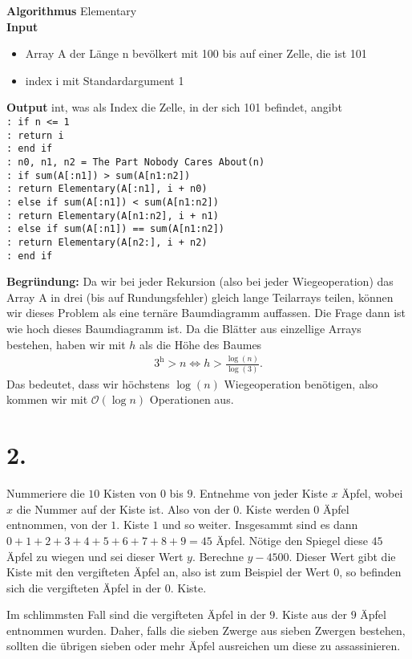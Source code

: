 \documentclass[a4paper]{book}
\theoremstyle{definition}
\begin{document}
\vspace{1cm}

\noindent\textbf{Algorithmus} Elementary \\
\textbf{Input}
\begin{itemize}
    \item Array A der Länge n bevölkert mit 100 bis auf einer Zelle, die ist 101
    \item index i mit Standardargument 1
\end{itemize}
\textbf{Output} int, was als Index die Zelle, in der sich 101 befindet, angibt \\
\texttt{: if n <= 1 \\
: \indent return i \\
: end if \\
: n0, n1, n2 = The Part Nobody Cares About(n) \\
: if sum(A[:n1]) > sum(A[n1:n2]) \\
: \indent return Elementary(A[:n1], i + n0) \\
: else if sum(A[:n1]) < sum(A[n1:n2]) \\
: \indent return Elementary(A[n1:n2], i + n1) \\
: else if sum(A[:n1]) == sum(A[n1:n2]) \\
: \indent return Elementary(A[n2:], i + n2) \\
: end if}

\vspace{1cm}

\noindent\textbf{Begründung:} Da wir bei jeder Rekursion (also bei jeder Wiegeoperation) das Array A in drei (bis auf Rundungsfehler) gleich lange Teilarrays teilen, können wir dieses Problem als eine ternäre Baumdiagramm auffassen. Die Frage dann ist wie hoch dieses Baumdiagramm ist. Da die Blätter aus einzellige Arrays bestehen, haben wir mit \(h\) als die Höhe des Baumes
\begin{align*}
    3^\text{h} > n \iff h > \frac{\log(n)}{\log(3)} \text{.}
\end{align*}
Das bedeutet, dass wir höchstens \(\log(n)\) Wiegeoperation benötigen, also kommen wir mit \(\mathcal{O}(\log n)\) Operationen aus.

\section*{2.}

Nummeriere die \(10\) Kisten von \(0\) bis \(9\). Entnehme von jeder Kiste \(x\) Äpfel, wobei \(x\) die Nummer auf der Kiste ist. Also von der \(0.\) Kiste werden \(0\) Äpfel entnommen, von der \(1.\) Kiste \(1\) und so weiter. Insgesammt sind es dann \(0 + 1 + 2 + 3 + 4 + 5 + 6 + 7 + 8 + 9 = 45\) Äpfel. Nötige den Spiegel diese \(45\) Äpfel zu wiegen und sei dieser Wert \(y\). Berechne \(y - 4500\). Dieser Wert gibt die Kiste mit den vergifteten Äpfel an, also ist zum Beispiel der Wert \(0\), so befinden sich die vergifteten Äpfel in der \(0.\) Kiste.

Im schlimmsten Fall sind die vergifteten Äpfel in der \(9.\) Kiste aus der \(9\) Äpfel entnommen wurden. Daher, falls die sieben Zwerge aus sieben Zwergen bestehen, sollten die übrigen sieben oder mehr Äpfel ausreichen um diese zu assassinieren.
\end{document}
